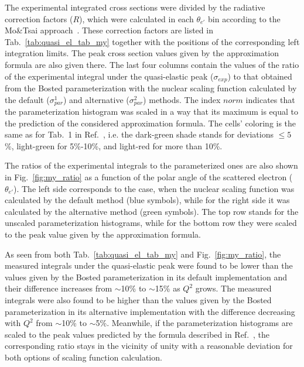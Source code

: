 The experimental integrated cross sections were divided by the radiative correction factors ($R$), which were calculated in each $\theta_{e'}$ bin according to the Mo\&Tsai approach~\cite{Mo:1968cg}. These correction factors are listed in Tab.~\ref{tab:quasi_el_tab_my} together with the positions of the corresponding left integration limits. The peak cross section values given by the approximation formula are also given there. The last four columns contain the values of the ratio of the experimental integral under the quasi-elastic peak ($\sigma_{exp}$) to that obtained from the Bosted parameterization with the nuclear scaling function calculated by the default ($\sigma_{par}^{1}$) and alternative ($\sigma_{par}^{2}$) methods. The index $norm$ indicates that the parameterization histogram was scaled in a way that its maximum is equal to the prediction of the considered approximation formula. The cells' coloring is the same as for Tab.~1 in Ref.~\cite{note_QE_peak}, i.e. the dark-green shade stands for deviations $\leq 5$\%, light-green for 5\%-10\%, and light-red for more than 10\%.



The ratios of the experimental integrals to the parameterized ones are also shown in Fig.~\ref{fig:my_ratio} as a function of the polar angle of the scattered electron ($\theta_{e'}$). The left side corresponds to the case, when the nuclear scaling function was calculated by the default method (blue symbols), while for the right side it was calculated by the alternative method (green symbols). The top row stands for the unscaled parameterization histograms, while for the bottom row they were scaled to the peak value given by the approximation formula. 


As seen from both Tab.~\ref{tab:quasi_el_tab_my} and Fig.~\ref{fig:my_ratio}, the measured integrals under the quasi-elastic peak were found to be lower than the values given by the Bosted parameterization in its default implementation and their difference increases from $\sim$10\% to $\sim$15\% as $Q^{2}$ grows. The measured integrals were also found to be higher than the values given by the Bosted parameterization in its alternative implementation with the difference decreasing with $Q^{2}$ from $\sim$10\% to $\sim$5\%. Meanwhile, if the parameterization histograms are scaled to the peak values predicted by the formula described in Ref.~\cite{note_QE_peak}, the corresponding ratio stays in the vicinity of unity with a reasonable deviation for both options of scaling function calculation. 

